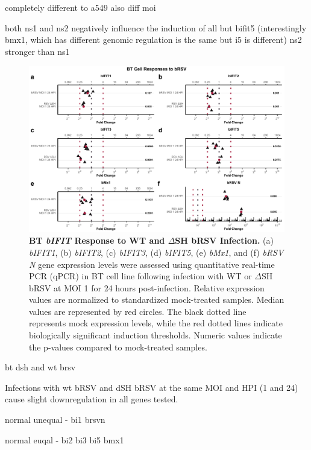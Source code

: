 completely different to a549
    also diff moi

both ns1 and ns2 negatively influence the induction of all but bifit5 (interestingly bmx1, which has different genomic regulation is the same but i5 is different)
ns2 stronger than ns1

\begin{figure}
    \centering
    \includegraphics[width=1\linewidth]{07. Chapter 2/Figs/02. Induction/09. bt_brsv.pdf}
    \caption[BT \textit{bIFIT} Response to WT and \(\Delta\)SH bRSV Infection.]{\textbf{BT \textit{bIFIT} Response to WT and \(\Delta\)SH bRSV Infection.} (a) \textit{bIFIT1}, (b) \textit{bIFIT2}, (c) \textit{bIFIT3}, (d) \textit{bIFIT5}, (e) \textit{bMx1}, and (f) \textit{bRSV N} gene expression levels were assessed using quantitative real-time PCR (qPCR) in BT cell line following infection with WT or \(\Delta\)SH bRSV at MOI 1 for 24 hours post-infection. Relative expression values are normalized to standardized mock-treated samples. Median values are represented by red circles. The black dotted line represents mock expression levels, while the red dotted lines indicate biologically significant induction thresholds. Numeric values indicate the p-values compared to mock-treated samples.}
    \label{fig:BT responses to bRSV}
\end{figure}
    
bt dsh and wt brsv
    
Infections with wt bRSV and dSH bRSV at the same MOI and HPI (1 and 24) cause slight downregulation in all genes tested.
    
normal unequal - bi1 brsvn
    
normal euqal - bi2 bi3 bi5 bmx1
    
